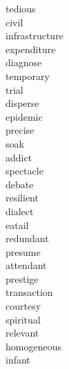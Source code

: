 \documentclass[a4paper, 10pt]{ctexart}
\begin{document}
\begin{multicols*}{2}
\begin{description}
\item[tedious]

\item[civil]

\item[infrastructure]

\item[expenditure]

\item[diagnose]

\item[temporary]

\item[trial]

\item[disperse]

\item[epidemic]

\item[precise]

\item[soak]

\item[addict]

\item[spectacle]

\item[debate]

\item[resilient]

\item[dialect]

\item[eatail]

\item[redundant]

\item[presume]

\item[attendant]

\item[prestige]

\item[transaction]

\item[courtesy]

\item[spiritual]

\item[relevant]

\item[homogeneous]

\item[infant]


\end{description}
\end{multicols*}
\end{document}
